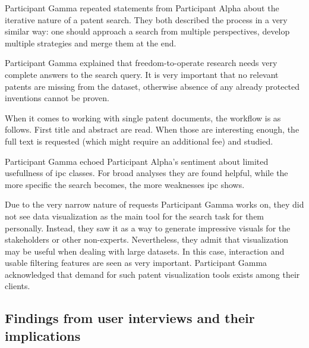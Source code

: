 Participant Gamma repeated statements from Participant Alpha about the iterative nature of a patent search. 
They both described the process in a very similar way: one should approach a search from multiple perspectives, develop multiple strategies and merge them at the end.

Participant Gamma explained that freedom-to-operate research needs very complete answers to the search query.
It is very important that no relevant patents are missing from the dataset, otherwise absence of any already protected inventions cannot be proven.

When it comes to working with single patent documents, the workflow is as follows. 
First title and abstract are read. When those are interesting enough, the full text is requested (which might require an additional fee) and studied. 

Participant Gamma echoed Participant Alpha's sentiment about limited usefullness of \gls{ipc} classes. 
For broad analyses they are found helpful, while the more specific the search becomes, the more weaknesses \gls{ipc} shows.

Due to the very narrow nature of requests Participant Gamma works on, they did not see data visualization as the main tool for the search task for them personally.
Instead, they saw it as a way to generate impressive visuals for the stakeholders or other non-experts. 
Nevertheless, they admit that visualization may be useful when dealing with large datasets. 
In this case, interaction and usable filtering features are seen as very important.
Participant Gamma acknowledged that demand for such patent visualization tools exists among their clients.

\subsection{Findings from user interviews and their implications}
\label{subsec:implications}

